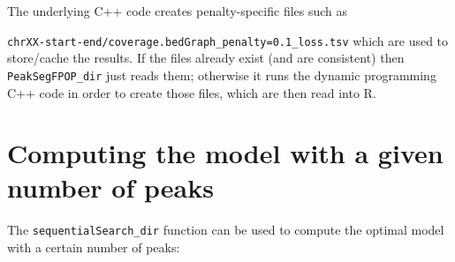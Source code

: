 \documentclass[12pt]{article}\usepackage[]{graphicx}\usepackage[]{color}
\begin{document}
The
underlying C++ code
creates penalty-specific files such as

\verb|chrXX-start-end/coverage.bedGraph_penalty=0.1_loss.tsv| which
are used to store/cache the results.  If the files already exist (and
are consistent) then \verb|PeakSegFPOP_dir| just reads them; otherwise
it runs the dynamic programming C++ code in order to create those
files, which are then read into R.

\section{Computing the model with a given number of peaks}

The \verb|sequentialSearch_dir| function can be used to compute the
optimal model with a certain number of peaks:
\end{document}
